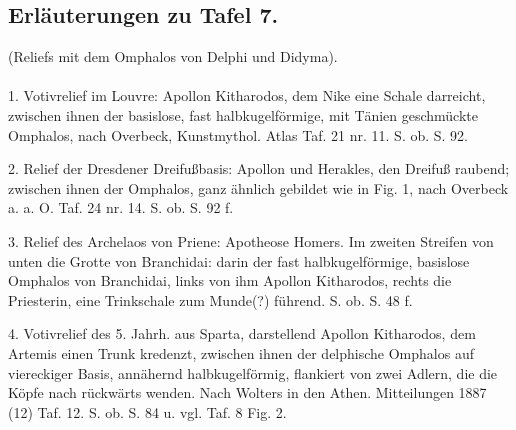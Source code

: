 \documentclass[a4paper, 11pt, oneside]{article}
\begin{document}
\subsection{Erläuterungen zu Tafel 7.}
\begin{center}
(Reliefs mit dem Omphalos von Delphi und Didyma).
\end{center}
\paragraph{}
1. Votivrelief im Louvre: Apollon Kitharodos, dem Nike eine Schale darreicht, zwischen ihnen der basislose, fast halbkugelförmige, mit Tänien geschmückte Omphalos, nach Overbeck, Kunstmythol. Atlas Taf. 21 nr. 11. S. ob. S. 92.

2. Relief der Dresdener Dreifußbasis: Apollon und Herakles, den Dreifuß raubend; zwischen ihnen der Omphalos, ganz ähnlich gebildet wie in Fig. 1, nach Overbeck a. a. O. Taf. 24 nr. 14. S. ob. S. 92 f.

3. Relief des Archelaos von Priene: Apotheose Homers. Im zweiten Streifen von unten die Grotte von Branchidai: darin der fast halbkugelförmige, basislose Omphalos von Branchidai, links von ihm Apollon Kitharodos, rechts die Priesterin, eine Trinkschale zum Munde(?) führend. S. ob. S. 48 f.

4. Votivrelief des 5. Jahrh. aus Sparta, darstellend Apollon Kitharodos, dem Artemis einen Trunk kredenzt, zwischen ihnen der delphische Omphalos auf viereckiger Basis, annähernd halbkugelförmig, flankiert von zwei Adlern, die die Köpfe nach rückwärts wenden. Nach Wolters in den Athen. Mitteilungen 1887 (12) Taf. 12. S. ob. S. 84 u. vgl. Taf. 8 Fig. 2.
\end{document}

